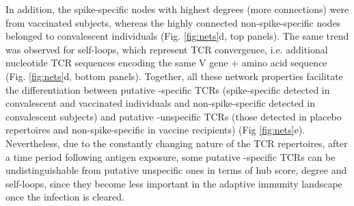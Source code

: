 In addition, the spike-specific nodes with highest degrees (more connections) were from vaccinated subjects, whereas the highly connected non-spike-specific nodes belonged to convalescent individuals (Fig. \ref{fig:nets}d, top panels). The same trend was observed for self-loops, which represent TCR convergence, i.e. additional nucleotide TCR sequences encoding the same V gene + amino acid sequence (Fig. \ref{fig:nets}d, bottom panels). Together, all these network properties facilitate the differentiation between putative \covid-specific TCRs (spike-specific detected in convalescent and vaccinated individuals and non-spike-specific detected in convalescent subjects) and putative \covid-unspecific TCRs (those detected in placebo repertoires and non-spike-specific in vaccine recipients) (Fig \ref{fig:nets}e). Nevertheless, due to the constantly changing nature of the TCR repertoires, after a time period following antigen exposure, some putative \covid-specific TCRs can be undistinguishable from putative unspecific ones in terms of hub score, degree and self-loops, since they become less important in the adaptive immunity landscape once the infection is cleared.



